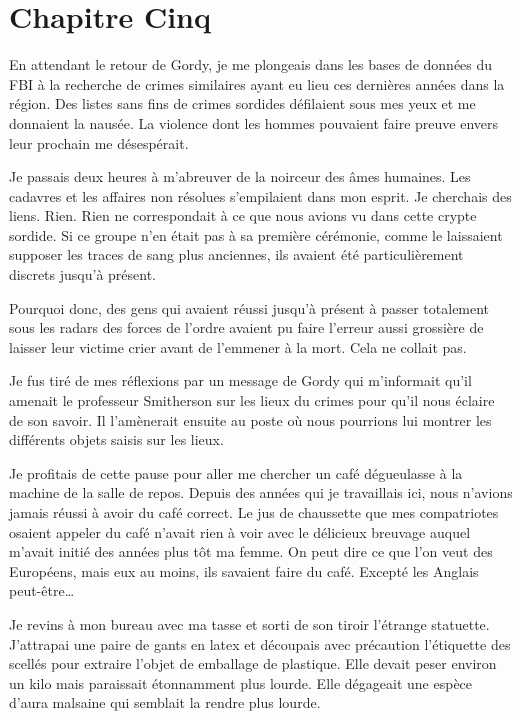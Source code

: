 \chapter[Chapitre Cinq]{Chapitre Cinq}
En attendant le retour de Gordy, je me plongeais dans les bases de données du FBI à la recherche de crimes similaires
ayant eu lieu ces dernières années dans la région. Des listes sans fins de crimes sordides défilaient sous mes yeux et
me donnaient la nausée. La violence dont les hommes pouvaient faire preuve envers leur prochain me désespérait.

Je passais deux heures à m'abreuver de la noirceur des âmes humaines. Les cadavres et les affaires non résolues
s'empilaient dans mon esprit. Je cherchais des liens. Rien. Rien ne correspondait à ce que nous avions vu dans cette
crypte sordide. Si ce groupe n'en était pas à sa première cérémonie, comme le laissaient supposer les traces de sang
plus anciennes, ils avaient été particulièrement discrets jusqu'à présent.

Pourquoi donc, des gens qui avaient réussi jusqu'à présent à passer totalement sous les radars des forces de l'ordre
avaient pu faire l'erreur aussi grossière de laisser leur victime crier avant de l'emmener à la mort. Cela ne collait
pas.

Je fus tiré de mes réflexions par un message de Gordy qui m'informait qu'il amenait le professeur Smitherson sur les
lieux du crimes pour qu'il nous éclaire de son savoir. Il l'amènerait ensuite au poste où nous pourrions lui montrer
les différents objets saisis sur les lieux.

Je profitais de cette pause pour aller me chercher un café dégueulasse à la machine de la salle de repos. Depuis des
années qui je travaillais ici, nous n'avions jamais réussi à avoir du café correct. Le jus de chaussette que mes
compatriotes osaient appeler du café n'avait rien à voir avec le délicieux breuvage auquel m'avait initié des années
plus tôt ma femme. On peut dire ce que l'on veut des Européens, mais eux au moins, ils savaient faire du café. Excepté
les Anglais peut-être\ldots{}

Je revins à mon bureau avec ma tasse et sorti de son tiroir l'étrange statuette. J'attrapai une paire de gants en latex
et découpais avec précaution l'étiquette des scellés pour extraire l'objet de emballage de plastique. Elle devait peser
environ un kilo mais paraissait étonnamment plus lourde. Elle dégageait une espèce d'aura malsaine qui semblait la
rendre plus lourde.

